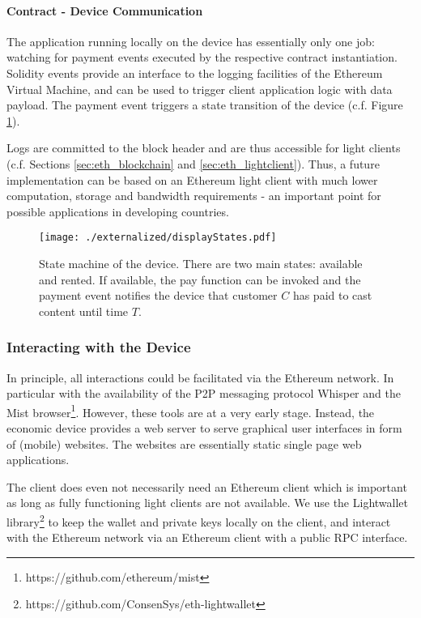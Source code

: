 \paragraph{Contract - Device Communication}

The application running locally on the device has essentially only one job: watching for payment events executed by the respective contract instantiation. Solidity events provide an interface to the logging facilities of the Ethereum Virtual Machine, and can be used to trigger client application logic with data payload. The payment event triggers a state transition of the device (c.f. Figure \ref{fig:displayStates}).

Logs are committed to the block header and are thus accessible for light clients (c.f. Sections \ref{sec:eth_blockchain} and \ref{sec:eth_lightclient}). Thus, a future implementation can be based on an Ethereum light client with much lower computation, storage and bandwidth requirements - an important point for possible applications in developing countries.

\begin{figure}
 \centering
 \texttt{[image: ./externalized/displayStates.pdf]}
 \caption{State machine of the device. There are two main states: available and rented. If available, the pay function can be invoked and the payment event notifies the device that customer $C$ has paid to cast content until time $T$.}
 \label{fig:displayStates}
 \end{figure}


\subsubsection{Interacting with the Device}

In principle, all interactions could be facilitated via the Ethereum network. In particular with the availability of the \ac{P2P} messaging protocol Whisper \parencite{whisper} and the Mist browser\footnote{https://github.com/ethereum/mist}. However, these tools are at a very early stage. Instead, the economic device provides a web server to serve graphical user interfaces in form of (mobile) websites. The websites are essentially static single page web applications. 

The client does even not necessarily need an Ethereum client which is important as long as fully functioning light clients are not available. We use the Lightwallet library\footnote{https://github.com/ConsenSys/eth-lightwallet} to keep the wallet and private keys locally on the client, and interact with the Ethereum network via an Ethereum client with a public \ac{RPC} interface.

